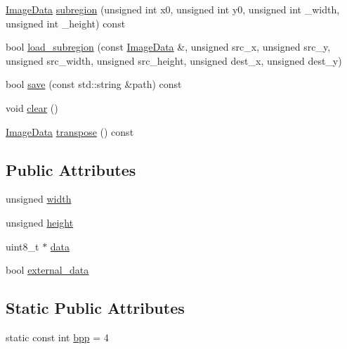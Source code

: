 \begin{DoxyCompactItemize}
\item 
\hyperlink{structpixel_1_1graphics_1_1_image_data}{Image\+Data} \hyperlink{structpixel_1_1graphics_1_1_image_data_a906eb1e4aa34ab928cfe5500a5ed70e4}{subregion} (unsigned int x0, unsigned int y0, unsigned int \+\_\+width, unsigned int \+\_\+height) const
\item 
bool \hyperlink{structpixel_1_1graphics_1_1_image_data_a2881f91adbd6e438f58a5a832d6cfdf4}{load\+\_\+subregion} (const \hyperlink{structpixel_1_1graphics_1_1_image_data}{Image\+Data} \&, unsigned src\+\_\+x, unsigned src\+\_\+y, unsigned src\+\_\+width, unsigned src\+\_\+height, unsigned dest\+\_\+x, unsigned dest\+\_\+y)
\item 
bool \hyperlink{structpixel_1_1graphics_1_1_image_data_adca97f9888d7da5f9d95c781a2700cd4}{save} (const std\+::string \&path) const
\item 
void \hyperlink{structpixel_1_1graphics_1_1_image_data_af3a5790a3f3a336ddc5edd030b6fc7a3}{clear} ()
\item 
\hyperlink{structpixel_1_1graphics_1_1_image_data}{Image\+Data} \hyperlink{structpixel_1_1graphics_1_1_image_data_aaed4255fc7c7edc0282ce58c111e27ed}{transpose} () const
\end{DoxyCompactItemize}
\subsection*{Public Attributes}
\begin{DoxyCompactItemize}
\item 
unsigned \hyperlink{structpixel_1_1graphics_1_1_image_data_a783c857c18bf3d306f08ff990d0a0387}{width}
\item 
unsigned \hyperlink{structpixel_1_1graphics_1_1_image_data_a0cdbbd8ac40876965eb439f6fb8b8b74}{height}
\item 
uint8\+\_\+t $\ast$ \hyperlink{structpixel_1_1graphics_1_1_image_data_a0ae00692d59dfe806c4fc4717c4a8598}{data}
\item 
bool \hyperlink{structpixel_1_1graphics_1_1_image_data_adbb7e4f741fefc4f347526a26b2920b8}{external\+\_\+data}
\end{DoxyCompactItemize}
\subsection*{Static Public Attributes}
\begin{DoxyCompactItemize}
\item 
static const int \hyperlink{structpixel_1_1graphics_1_1_image_data_a20702befa5bfceaf6754ce1d611fe438}{bpp} = 4
\end{DoxyCompactItemize}


